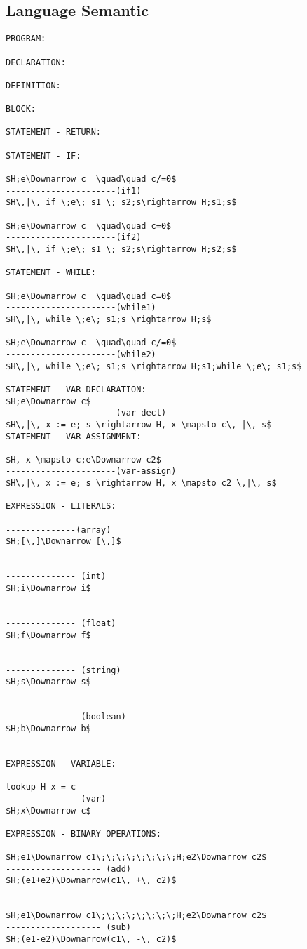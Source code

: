 \documentclass[11pt, a4paper]{article}
\begin{document}
\subsection*{Language Semantic}
\begin{lstlisting}
PROGRAM:

DECLARATION:

DEFINITION:

BLOCK:

STATEMENT - RETURN:

STATEMENT - IF:

$H;e\Downarrow c  \quad\quad c/=0$
----------------------(if1)
$H\,|\, if \;e\; s1 \; s2;s\rightarrow H;s1;s$

$H;e\Downarrow c  \quad\quad c=0$
----------------------(if2)
$H\,|\, if \;e\; s1 \; s2;s\rightarrow H;s2;s$

STATEMENT - WHILE:

$H;e\Downarrow c  \quad\quad c=0$
----------------------(while1)
$H\,|\, while \;e\; s1;s \rightarrow H;s$

$H;e\Downarrow c  \quad\quad c/=0$
----------------------(while2)
$H\,|\, while \;e\; s1;s \rightarrow H;s1;while \;e\; s1;s$

STATEMENT - VAR DECLARATION:
$H;e\Downarrow c$
----------------------(var-decl)
$H\,|\, x := e; s \rightarrow H, x \mapsto c\, |\, s$
STATEMENT - VAR ASSIGNMENT:

$H, x \mapsto c;e\Downarrow c2$
----------------------(var-assign)
$H\,|\, x := e; s \rightarrow H, x \mapsto c2 \,|\, s$

EXPRESSION - LITERALS:

--------------(array)
$H;[\,]\Downarrow [\,]$


-------------- (int)
$H;i\Downarrow i$


-------------- (float)
$H;f\Downarrow f$


-------------- (string)
$H;s\Downarrow s$


-------------- (boolean)
$H;b\Downarrow b$


EXPRESSION - VARIABLE:

lookup H x = c
-------------- (var)
$H;x\Downarrow c$

EXPRESSION - BINARY OPERATIONS:

$H;e1\Downarrow c1\;\;\;\;\;\;\;\;H;e2\Downarrow c2$
------------------- (add)
$H;(e1+e2)\Downarrow(c1\, +\, c2)$


$H;e1\Downarrow c1\;\;\;\;\;\;\;\;H;e2\Downarrow c2$
------------------- (sub)
$H;(e1-e2)\Downarrow(c1\, -\, c2)$



\end{lstlisting}
\end{document}
